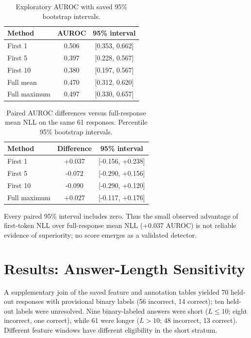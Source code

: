 \documentclass[runningheads]{llncs}
\begin{document}
\begin{table}[t]
\centering\caption{Exploratory AUROC with saved 95\% bootstrap intervals.}\label{tab:ci}
\begin{tabular}{lcc}\toprule
Method & AUROC & 95\% interval\\\midrule
First 1 & 0.506 & [0.353, 0.662]\\
First 5 & 0.397 & [0.228, 0.567]\\
First 10 & 0.380 & [0.197, 0.567]\\
Full mean & 0.470 & [0.312, 0.620]\\
Full maximum & 0.497 & [0.330, 0.657]\\\bottomrule
\end{tabular}
\end{table}
\begin{table}[t]\centering
\caption{Paired AUROC differences versus full-response mean NLL on the same 61 responses. Percentile 95\% bootstrap intervals.}\label{tab:paired}
\begin{tabular}{lcc}\toprule
Method & Difference & 95\% interval\\\midrule
First 1 & +0.037 & [-0.156, +0.238]\\
First 5 & -0.072 & [-0.290, +0.156]\\
First 10 & -0.090 & [-0.290, +0.120]\\
Full maximum & +0.027 & [-0.117, +0.176]\\
\bottomrule\end{tabular}
\end{table}

Every paired 95\% interval includes zero. Thus the small observed advantage of first-token NLL over full-response mean NLL (+0.037 AUROC) is not reliable evidence of superiority; no score emerges as a validated detector.
\section{Results: Answer-Length Sensitivity}
A supplementary join of the saved feature and annotation tables yielded 70 held-out responses with provisional binary labels (56 incorrect, 14 correct); ten held-out labels were unresolved. Nine binary-labeled answers were short ($L\leq10$; eight incorrect, one correct), while 61 were longer ($L>10$; 48 incorrect, 13 correct). Different feature windows have different eligibility in the short stratum.
\end{document}
